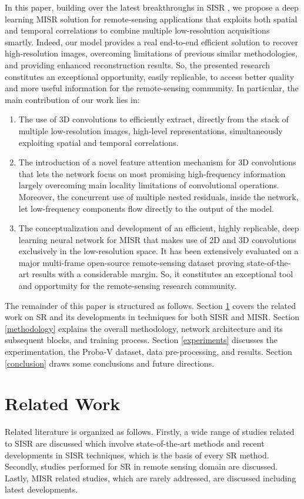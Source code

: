 \documentclass[journal]{IEEEtran}
\begin{document}
In this paper, building over the latest breakthroughs in SISR \cite{dong2015image, lim2017enhanced, yu2018wide, zhang2018image, dai2019second}, we propose a deep learning MISR solution for remote-sensing applications that exploits both spatial and temporal correlations to combine multiple low-resolution acquisitions smartly. Indeed, our model provides a real end-to-end efficient solution to recover high-resolution images, overcoming limitations of previous similar methodologies, and providing enhanced reconstruction results. So, the presented research constitutes an exceptional opportunity, easily replicable, to access better quality and more useful information for the remote-sensing community. In particular, the main contribution of our work lies in:
\begin{enumerate}
\item The use of 3D convolutions to efficiently extract, directly from the stack of multiple low-resolution images, high-level representations, simultaneously exploiting spatial and temporal correlations.
\item The introduction of a novel feature attention mechanism for 3D convolutions that lets the network focus on most promising high-frequency information largely overcoming main locality limitations of convolutional operations. Moreover, the concurrent use of multiple nested residuals, inside the network, let low-frequency components flow directly to the output of the model.
\item The conceptualization and development of an efficient, highly replicable, deep learning neural network for MISR that makes use of 2D and 3D convolutions exclusively in the low-resolution space. It has been extensively evaluated on a major multi-frame open-source remote-sensing dataset proving state-of-the-art results with a considerable margin. So, it constitutes an exceptional tool and opportunity for the remote-sensing research community.
\end{enumerate}

The remainder of this paper is structured as follows. Section \ref{relatedwork} covers the related work on SR and its developments in techniques for both SISR and MISR. Section \ref{methodology} explains the overall methodology, network architecture and its subsequent blocks, and training process. Section \ref{experiments} discusses the experimentation, the Proba-V dataset, data pre-processing, and results. Section \ref{conclusion} draws some conclusions and future directions.

\section{Related Work} \label{relatedwork}
Related literature is organized as follows. Firstly, a wide range of studies related to SISR are discussed which involve state-of-the-art methods and recent developments in SISR techniques, which is the basis of every SR method. Secondly, studies performed for SR in remote sensing domain are discussed. Lastly, MISR related studies, which are rarely addressed, are discussed including latest developments.     
\end{document}
